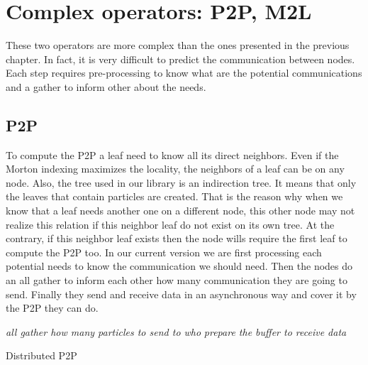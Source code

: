 \documentclass[12pt,letterpaper,titlepage]{report}
\begin{document}
\chapter{Complex operators: P2P, M2L}
These two operators are more complex than the ones presented in the previous chapter.
In fact, it is very difficult to predict the communication between nodes.
Each step requires pre-processing to know what are the potential communications and a gather to inform other about the needs.
\section{P2P}
To compute the P2P a leaf need to know all its direct neighbors.
Even if the Morton indexing maximizes the locality, the neighbors of a leaf can be on any node.
Also, the tree used in our library is an indirection tree.
It means that only the leaves that contain particles are created.
That is the reason why when we know that a leaf needs another one on a different node, this other node may not realize this relation if this neighbor leaf do not exist on its own tree.
At the contrary, if this neighbor leaf exists then the node wills require the first leaf to compute the P2P too.
In our current version we are first processing each potential needs to know the communication we should need.
Then the nodes do an all gather to inform each other how many communication they are going to send.
Finally they send and receive data in an asynchronous way and cover it by the P2P they can do.
\BlankLine
\begin{algorithm}[H]
\linesnumbered
\SetLine
{}
\BlankLine
{}
\emph{all gather how many particles to send to who}\;
\emph{prepare the buffer to receive data}\;
\BlankLine
\caption{Distributed P2P}
\end{algorithm}
\end{document}
